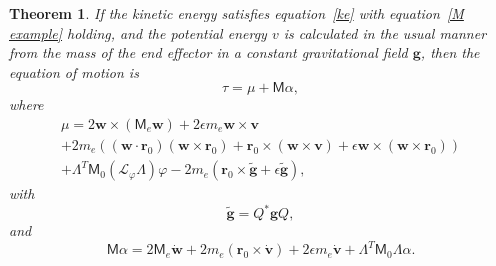 \documentclass[reqno,12pt]{amsart}
\newcommand{\liederiv}{\mathcal L}
\newtheorem{theorem}{Theorem}
\begin{document}
\begin{theorem}
\label{equation of motion}
If the kinetic energy satisfies equation~\eqref{ke} with equation~\eqref{M example} holding, and the potential energy $v$ is calculated in the usual manner from the mass of the end effector in a constant gravitational field $\bm g$, then the equation of motion is
\begin{equation}
\tau = \mu + \mathsf M \alpha,
\end{equation}
where
\begin{multline}
\label{tau example}
\mu = 2\bm w \times (\mathsf M_e \bm w) + 2\epsilon m_e \bm w \times \bm v \\
+ 2 m_e ((\bm w \cdot \bm r_0) (\bm w \times \bm r_0) + \bm r_0 \times (\bm w \times \bm v) + \epsilon \bm w \times (\bm w \times \bm r_0)) \\
+ \mathsf \Lambda^T \mathsf M_0 (\liederiv_\varphi \mathsf \Lambda) \varphi 
- 2 m_e (\bm r_0 \times \tilde{\bm g} + \epsilon \tilde{\bm g}) ,
\end{multline}
with
\begin{equation}
\tilde{\bm g} = Q^* \bm g Q ,
\end{equation}
and
\begin{equation}
\mathsf M \alpha = 2 \mathsf M_e \dot{\bm w} + 2 m_e (\bm r_0 \times \dot{\bm v}) + 2 \epsilon m_e \dot{\bm v} + \mathsf\Lambda^T \mathsf M_0 \mathsf \Lambda \alpha.
\end{equation}
\end{theorem}
\end{document}

